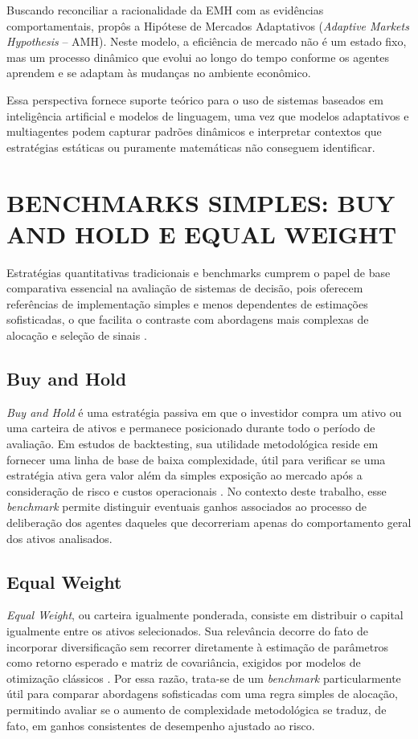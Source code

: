 \documentclass{eic-bcc-tcc}
\begin{document}
Buscando reconciliar a racionalidade da EMH com as evidências comportamentais, \citet{Lo2004} propôs a Hipótese de Mercados Adaptativos (\textit{Adaptive Markets Hypothesis} -- AMH). Neste modelo, a eficiência de mercado não é um estado fixo, mas um processo dinâmico que evolui ao longo do tempo conforme os agentes aprendem e se adaptam às mudanças no ambiente econômico.

Essa perspectiva fornece suporte teórico para o uso de sistemas baseados em inteligência artificial e modelos de linguagem, uma vez que modelos adaptativos e multiagentes podem capturar padrões dinâmicos e interpretar contextos que estratégias estáticas ou puramente matemáticas não conseguem identificar.

\section{BENCHMARKS SIMPLES: BUY AND HOLD E EQUAL WEIGHT}

Estratégias quantitativas tradicionais e benchmarks cumprem o papel de base comparativa essencial na avaliação de sistemas de decisão, pois oferecem referências de implementação simples e menos dependentes de estimações sofisticadas, o que facilita o contraste com abordagens mais complexas de alocação e seleção de sinais \citep{Markowitz1952, Clarke2006, LopezDePrado2018}.

\subsection{Buy and Hold}
\textit{Buy and Hold} é uma estratégia passiva em que o investidor compra um ativo ou uma carteira de ativos e permanece posicionado durante todo o período de avaliação. Em estudos de backtesting, sua utilidade metodológica reside em fornecer uma linha de base de baixa complexidade, útil para verificar se uma estratégia ativa gera valor além da simples exposição ao mercado após a consideração de risco e custos operacionais \citep{LopezDePrado2018, Bailey2014}. No contexto deste trabalho, esse \textit{benchmark} permite distinguir eventuais ganhos associados ao processo de deliberação dos agentes daqueles que decorreriam apenas do comportamento geral dos ativos analisados.

\subsection{Equal Weight}
\textit{Equal Weight}, ou carteira igualmente ponderada, consiste em distribuir o capital igualmente entre os ativos selecionados. Sua relevância decorre do fato de incorporar diversificação sem recorrer diretamente à estimação de parâmetros como retorno esperado e matriz de covariância, exigidos por modelos de otimização clássicos \citep{Markowitz1952, Clarke2006, DeMiguel2009}. Por essa razão, trata-se de um \textit{benchmark} particularmente útil para comparar abordagens sofisticadas com uma regra simples de alocação, permitindo avaliar se o aumento de complexidade metodológica se traduz, de fato, em ganhos consistentes de desempenho ajustado ao risco.
\end{document}
